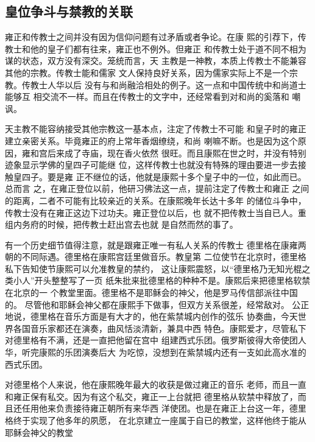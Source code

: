 \subsection{皇位争斗与禁教的关联}
\par
雍正和传教士之间并没有因为信仰问题有过矛盾或者争论。在康%
熙的引荐下，传教士和他的皇子们都有往来，雍正也不例外。但雍正%
和传教士处于道不同不相为谋的状态，双方没有深交。笼统而言，天%
主教是一神教，本质上传教士不能兼容其他的宗教。传教士能和儒家%
文人保持良好关系，因为儒家实际上不是一个宗教。传教士人华以后%
没有与和尚融洽相处的例子。这一点和中国传统中和尚道士能够互%
相交流不一样。而且在传教士的文字中，还经常看到对和尚的奚落和%
嘲讽。%
\par
天主教不能容纳接受其他宗教这一基本点，注定了传教士不可能%
和皇子时的雍正建立亲密关系。毕竟雍正的府上常年香烟缭绕，和尚%
喇嘛不断。也是因为这个原因，雍和宫后来成了寺庙，现在香火依然%
很旺。而且康熙在世之时，并没有特别迹象显示学佛的皇四子可能继%
位，这样传教士也就没有特殊的理由要进一步去接触皇四子。要是雍%
正不继位的话，他就是康熙十多个皇子中的一位，如此而已。总而言%
之，在雍正登位以前，他研习佛法这一点，提前注定了传教士和雍正%
之间的距离，二者不可能有比较亲近的关系。在康熙晚年长达十多年%
的储位斗争中，传教士没有在雍正这边下过功夫。雍正登位以后，也%
就不把传教士当自已人。重组内务府的时候，把传教士赶出宫去也就%
是自然而然的事了。%
\par
有一个历史细节值得注意，就是跟雍正唯一有私人关系的传教士%
德里格在康雍两朝的不同际遇。德里格在康熙宫廷里做音乐。教皇第%
二位使节在北京时，德里格私下告知使节康熙可以允准教皇的禁约，%
这让康熙震怒，以“德里格乃无知光棍之类小人”开头整整写了一页%
纸朱批来批德里格的种种不是。康熙后来把德里格软禁在北京的一%
个教堂里面。德里格不是耶稣会的神父，他是罗马传信部派往中国的。%
尽管他和耶稣会神父都在康熙手下做事，但双方关系很差，经常敌对。%
公正地说，德里格在音乐方面是有大才的，他在紫禁城内创作的弦乐%
协奏曲，今天世界各国音乐家都还在演奏，曲风恬淡清新，兼具中西%
特色。康熙爱才，尽管私下对德里格有不满，还是一直把他留在宫中%
组建西式乐团。俄罗斯彼得大帝使团人华，听完康熙的乐团演奏后大%
为吃惊，没想到在紫禁城内还有一支如此高水准的西式乐团。%
\par
对德里格个人来说，他在康熙晚年最大的收获是做过雍正的音乐%
老师，而且一直和雍正保有私交。因为有这个私交，雍正一上台就把%
德里格从软禁中释放了，而且还任用他来负责接待雍正朝所有来华西%
洋使团。也是在雍正上台这一年，德里格终于实现了他多年的夙愿，%
在北京建立一座属于自已的教堂，这样他终于能从耶稣会神父的教堂%
